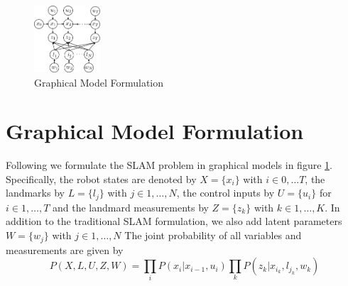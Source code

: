\begin{figure}
\begin{center}
 \includegraphics[width=0.22\textwidth]{fig/model} 
\end{center}
\caption{Graphical Model Formulation}
\label{fig:model}
\end{figure}

\section{Graphical Model Formulation}
Following \cite{isam} we formulate the SLAM problem in graphical models in figure \ref{fig:model}. Specifically, the robot states are denoted by $X = \{x_i\}$ with $i \in 0, \dots T$, the landmarks by $L = \{l_j\}$ with $j \in 1,\dots, N$, the control inputs by $U = \{u_i\}$ for $i \in 1,\dots, T$ and the landmard measurements by $Z = \{z_k\}$ with $k \in 1, \dots, K$. In addition to the traditional SLAM formulation, we also add latent parameters $W = \{w_j\}$ with $j \in 1, \dots, N$  The joint probability of all variables and measurements are given by
\begin{equation}
P(X, L, U, Z, W) = \prod\limits_{i}P(x_i|x_{i-1}, u_i)\prod\limits_{k}P(z_k|x_{i_k}, l_{j_k}, w_k)
\label{eq:jointProb}
\end{equation}


